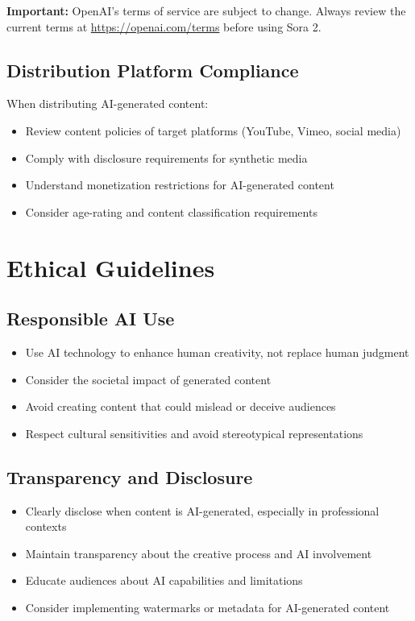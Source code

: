 \textbf{Important:} OpenAI's terms of service are subject to change. Always review the current terms at \url{https://openai.com/terms} before using Sora 2.

\subsection{Distribution Platform Compliance}
When distributing AI-generated content:
\begin{itemize}
\item Review content policies of target platforms (YouTube, Vimeo, social media)
\item Comply with disclosure requirements for synthetic media
\item Understand monetization restrictions for AI-generated content
\item Consider age-rating and content classification requirements
\end{itemize}

\section{Ethical Guidelines}

\subsection{Responsible AI Use}
\begin{itemize}
\item Use AI technology to enhance human creativity, not replace human judgment
\item Consider the societal impact of generated content
\item Avoid creating content that could mislead or deceive audiences
\item Respect cultural sensitivities and avoid stereotypical representations
\end{itemize}

\subsection{Transparency and Disclosure}
\begin{itemize}
\item Clearly disclose when content is AI-generated, especially in professional contexts
\item Maintain transparency about the creative process and AI involvement
\item Educate audiences about AI capabilities and limitations
\item Consider implementing watermarks or metadata for AI-generated content
\end{itemize}

